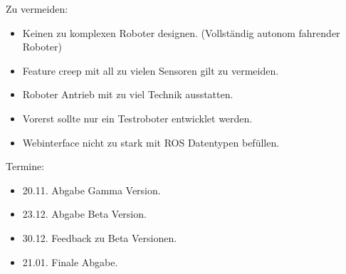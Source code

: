 \begin{flushleft}
    Zu vermeiden:
    \begin{itemize}
    \item Keinen zu komplexen Roboter designen. (Vollständig autonom fahrender Roboter)
    \item Feature creep mit all zu vielen Sensoren gilt zu vermeiden.
    \item Roboter Antrieb mit zu viel Technik ausstatten.
    \item Vorerst sollte nur ein Testroboter entwicklet werden.
    \item Webinterface nicht zu stark mit ROS Datentypen befüllen.
    \end {itemize}

    Termine:
    \begin{itemize}
    \item 20.11. Abgabe Gamma Version.
    \item 23.12. Abgabe Beta Version.
    \item 30.12. Feedback zu Beta Versionen.
    \item 21.01. Finale Abgabe.
    \end{itemize}
    
\end{flushleft}